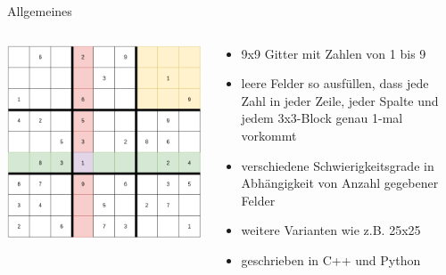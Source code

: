 \begin{frame}{Allgemeines}
    \begin{columns}[T] %
        \begin{column}{0.6\textwidth}
            \vspace*{0.75cm}
            \includegraphics[width=\textwidth]{Pictures/Leer.png}
        \end{column}
        \begin{column}{0.45\textwidth}
            \begin{itemize}
                \item 9x9 Gitter mit Zahlen von 1 bis 9
                \item leere Felder so ausfüllen, dass jede Zahl in
                jeder Zeile, jeder Spalte und jedem 3x3-Block genau 1-mal vorkommt
                \item verschiedene Schwierigkeitsgrade in Abhängigkeit von Anzahl 
                gegebener Felder
                \item weitere Varianten wie z.B. 25x25
                \item geschrieben in C++ und Python
            \end{itemize}
        \end{column}
    \end{columns}
\end{frame}